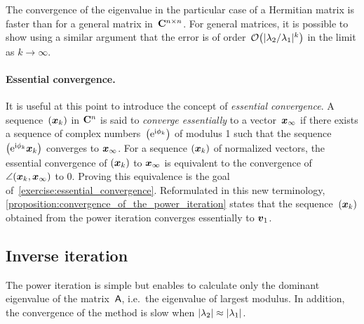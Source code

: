 The convergence of the eigenvalue in the particular case of a Hermitian matrix is faster than for a general matrix in~$\mathbf C^{n \times n}$.
For general matrices,
it is possible to show using a similar argument
that the error is of order~$\mathcal O\bigl(\lvert\lambda_2/\lambda_1\rvert^k\bigr)$
in the limit as $k \to \infty$.

\paragraph{Essential convergence.}
It is useful at this point to introduce the concept of \emph{essential convergence}.
A sequence~$(\mathbf{\boldsymbol{x}}_k)$ in $\mathbf C^n$ is said to \emph{converge essentially} to a vector~$\mathbf{\boldsymbol{x}}_{\infty}$ if
there exists a sequence of complex numbers~$\left(\mathrm e^{\mathrm i \phi_k}\right)$ of modulus 1 such that
the sequence $\left( \mathrm e^{\mathrm i \phi_k} \mathbf{\boldsymbol{x}}_k \right)$ converges to $\mathbf{\boldsymbol{x}}_{\infty}$.
For a sequence $(\mathbf{\boldsymbol{x}}_k)$ of normalized vectors,
the essential convergence of $(\mathbf{\boldsymbol{x}}_k)$ to $\mathbf{\boldsymbol{x}}_{\infty}$ is equivalent to the convergence of $\angle(\mathbf{\boldsymbol{x}}_k, \mathbf{\boldsymbol{x}}_{\infty})$ to 0.
Proving this equivalence is the goal of~\cref{exercise:essential_convergence}.
Reformulated in this new terminology,
\cref{proposition:convergence_of_the_power_iteration} states that the sequence~$(\mathbf{\boldsymbol{x}}_k)$ obtained from the power iteration converges essentially to $\mathbf{\boldsymbol{v}}_1$.

\subsection{Inverse iteration}
The power iteration is simple but enables to calculate only the dominant eigenvalue of the matrix~$\mathsf A$,
i.e.\ the eigenvalue of largest modulus.
In addition, the convergence of the method is slow when $\lvert\lambda_2\rvert \approx \lvert\lambda_1\rvert$.

